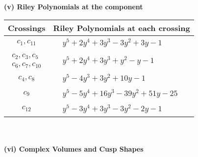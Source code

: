 \documentclass[1p]{elsarticle_modified}
\theoremstyle{definition}
\begin{document}
\newpage\renewcommand{\arraystretch}{1}
\flushleft \textbf{(v) Riley Polynomials at the component}\newline \\
\begin{tabular}{m{50pt}|m{274pt}}
Crossings & \hspace{64pt}Riley Polynomials at each crossing \\
\hline $$\begin{aligned}c_{1},c_{11}\end{aligned}$$&$\begin{aligned}
&y^5+2 y^4+3 y^3-3 y^2+3 y-1
\end{aligned}$\\
\hline $$\begin{aligned}c_{2},c_{3},c_{5}\\c_{6},c_{7},c_{10}\end{aligned}$$&$\begin{aligned}
&y^5+2 y^4+3 y^3+y^2- y-1
\end{aligned}$\\
\hline $$\begin{aligned}c_{4},c_{8}\end{aligned}$$&$\begin{aligned}
&y^5-4 y^3+3 y^2+10 y-1
\end{aligned}$\\
\hline $$\begin{aligned}c_{9}\end{aligned}$$&$\begin{aligned}
&y^5-5 y^4+16 y^3-39 y^2+51 y-25
\end{aligned}$\\
\hline $$\begin{aligned}c_{12}\end{aligned}$$&$\begin{aligned}
&y^5-3 y^4+3 y^3-3 y^2-2 y-1
\end{aligned}$\\
\hline
\end{tabular}\\~\\
\newpage\flushleft \textbf{(vi) Complex Volumes and Cusp Shapes}
\end{document}
